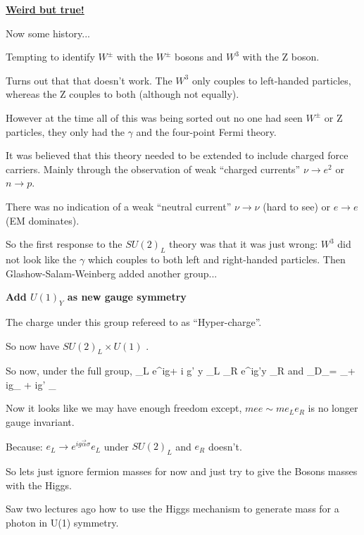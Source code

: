 {\textbf{\underline{Weird but true!}} 

\lineacross

Now some history...

Tempting to identify $W^\pm$ with the $W^\pm$ bosons and $W^3$ with the Z boson.

Turns out that that doesn't work. The $W^3$ only couples to left-handed particles, whereas the Z couples to both (although not equally).

However at the time all of this was being sorted out no one had seen $W^\pm$ or Z particles, they only  had the $\gamma$ and the four-point Fermi theory. 

It was believed that this theory needed to be extended to include charged force carriers. 
Mainly through the observation of weak ``charged currents''  $\nu \rightarrow e^2$ or $n \rightarrow p$.

There was no indication of a weak ``neutral current'' $\nu \rightarrow \nu$ (hard to see) or $e \rightarrow e$ (EM dominates).

So the first response to the $SU(2)_L$ theory was that it was just wrong: $W^3$ did not look like the $\gamma$ which couples to both left and right-handed particles. 
Then Glashow-Salam-Weinberg added another group...

\textbf{Add $U(1)_Y$ as new gauge symmetry}

The charge under this group refereed to as ``Hyper-charge''.

So now have $SU(2)_L \times U(1)$ . 

So now, under the full group,
\be
\phi_L \rightarrow e^{ig\alpha \cdot \sigma + i g' y} \phi_L \hspace*{1in} \phi_R \rightarrow e^{ig'y} \phi_R 
\ee
and
\be
\partial_\mu \rightarrow D_\mu = \partial_\mu + ig_\mu \cdot \vec{\sigma} + ig' _{}
\ee

Now it looks like we may have enough freedom except, $mee \sim m e_L e_R$ is no longer gauge invariant. 

Because: $e_L \rightarrow e^{ig\vec{\alpha}\sigma}e_L$ under $SU(2)_L$ and $e_R$ doesn't.

So lets just ignore fermion masses for now and just try to give the Bosons masses with the Higgs. 

\lineacross 

Saw two lectures ago how to use the Higgs mechanism to generate mass for a photon in U(1) symmetry. 

}
